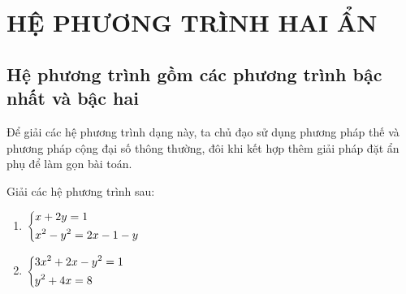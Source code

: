 \section{HỆ PHƯƠNG TRÌNH HAI ẨN}
\subsection{Hệ phương trình gồm các phương trình bậc nhất và bậc hai}
Để giải các hệ phương trình dạng này, ta chủ đạo sử dụng phương pháp thế và phương pháp cộng đại số thông thường, đôi khi kết hợp thêm giải pháp đặt ẩn phụ để làm gọn bài toán.
\begin{vd}%
Giải các hệ phương trình sau:
\begin{multicols}{2}
\begin{enumerate}
	\item $\left\{\begin{aligned}&x+2y=1\\&x^2-y^2=2x-1-y\end{aligned}\right.$
	\item $\left\{\begin{aligned}&3x^2+2x-y^2=1\\&y^2+4x=8\end{aligned}\right.$
\end{enumerate}
\end{multicols}
\end{vd}
